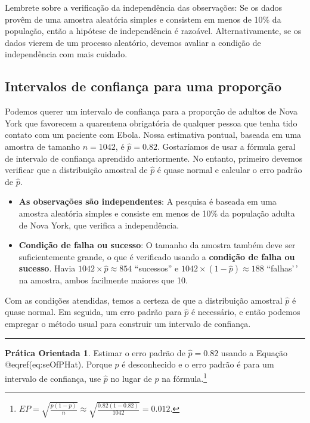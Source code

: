 \documentclass[
]{book}
\theoremstyle{definition}
\theoremstyle{definition}
\theoremstyle{definition}
\newtheorem{exercise}{Prática Orientada}[chapter]
\theoremstyle{definition}
\theoremstyle{remark}
\begin{document}
Lembrete sobre a verificação da independência das observações: Se os dados provêm de uma amostra aleatória simples e consistem em menos de 10\% da população, então a hipótese de independência é razoável. Alternativamente, se os dados vierem de um processo aleatório, devemos avaliar a condição de independência com mais cuidado.

\hypertarget{confidenceIntervalsOneProportion}{%
\subsection{Intervalos de confiança para uma proporção}\label{confidenceIntervalsOneProportion}}

Podemos querer um intervalo de confiança para a proporção de adultos de Nova York que favorecem a quarentena obrigatória de qualquer pessoa que tenha tido contato com um paciente com Ebola. Nossa estimativa pontual, baseada em uma amostra de tamanho \(n = 1042\), é \(\hat{p} = 0.82\). Gostaríamos de usar a fórmula geral de intervalo de confiança aprendido anteriormente. No entanto, primeiro devemos verificar que a distribuição amostral de \(\hat{p}\) é quase normal e calcular o erro padrão de \(\hat{p}\).

\begin{itemize}
\item
  \textbf{As observações são independentes}: A pesquisa é baseada em uma amostra aleatória simples e consiste em menos de 10\% da população adulta de Nova York, que verifica a independência.
\item
  \textbf{Condição de falha ou sucesso}: O tamanho da amostra também deve ser suficientemente grande, o que é verificado usando a \textbf{condição de falha ou sucesso}. Havia \(1042 \times \hat{p} \approx 854\) ``sucessos'' e \(1042 \times (1 - \hat{p}) \approx 188\) ``falhas'\,' na amostra, ambos facilmente maiores que 10.
\end{itemize}

Com as condições atendidas, temos a certeza de que a distribuição amostral \(\hat{p}\) é quase normal. Em seguida, um erro padrão para \(\hat{p}\) é necessário, e então podemos empregar o método usual para construir um intervalo de confiança.

\begin{center}\rule{0.5\linewidth}{0.5pt}\end{center}

\begin{exercise}
\protect\hypertarget{exr:seOfPropOfAmericansJobApprovalOfSupremeCourt}{}{\label{exr:seOfPropOfAmericansJobApprovalOfSupremeCourt} }Estimar o erro padrão de \(\hat{p} = 0.82\) usando a Equação @eqref(eq:seOfPHat). Porque \(p\) é desconhecido e o erro padrão é para um intervalo de confiança, use \(\hat{p}\) no lugar de \(p\) na fórmula.\footnote{\(EP = \sqrt{\frac{p(1-p)}{n}} \approx \sqrt{\frac{0.82 (1 - 0.82)}{1042}} = 0.012\).}
\end{exercise}
\end{document}
